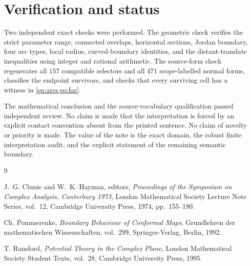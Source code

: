 \documentclass[10pt,reqno]{amsart}
\theoremstyle{definition}
\begin{document}
\section{Verification and status}

Two independent exact checks were performed.  The geometric check verifies
the strict parameter range, connected overlaps, horizontal sections, Jordan
boundary, four arc types, local radius, curved-boundary identities, and the
distant-translate inequalities using integer and rational arithmetic.  The
source-form check regenerates all \(157\) compatible selectors and all
\(471\) scope-labelled normal forms, classifies the endpoint survivors, and
checks that every surviving cell has a witness in \cref{eq:arcs,eq:far}.

The mathematical conclusion and the source-vocabulary qualification passed
independent review.  No claim is made that the interpretation is forced by
an explicit contact convention absent from the printed sentence.  No claim
of novelty or priority is made.  The value of the note is the exact domain,
the robust finite interpretation audit, and the explicit statement of the
remaining semantic boundary.

\begin{thebibliography}{9}

J.~G. Clunie and W.~K. Hayman, editors,
\emph{Proceedings of the Symposium on Complex Analysis, Canterbury 1973},
London Mathematical Society Lecture Note Series, vol.~12,
Cambridge University Press, 1974, pp.~155--180.

Ch. Pommerenke,
\emph{Boundary Behaviour of Conformal Maps},
Grundlehren der mathematischen Wissenschaften, vol.~299,
Springer-Verlag, Berlin, 1992.

T. Ransford,
\emph{Potential Theory in the Complex Plane},
London Mathematical Society Student Texts, vol.~28,
Cambridge University Press, 1995.

\end{thebibliography}
\end{document}
